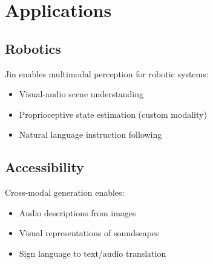 \section{Applications}


\subsection{Robotics}

Jin enables multimodal perception for robotic systems:
\begin{itemize}
    \item Visual-audio scene understanding
    \item Proprioceptive state estimation (custom modality)
    \item Natural language instruction following
\end{itemize}

\subsection{Accessibility}

Cross-modal generation enables:
\begin{itemize}
    \item Audio descriptions from images
    \item Visual representations of soundscapes
    \item Sign language to text/audio translation
\end{itemize}

